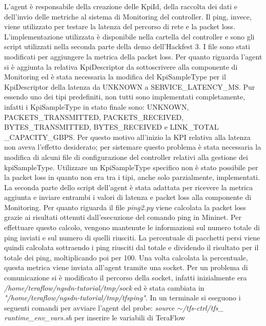 L'agent è responsabile della creazione delle KpiId, della raccolta dei dati e dell'invio delle metriche al sistema di Monitoring del controller.
Il ping, invece, viene utilizzato per testare la latenza del percorso di rete e la packet loss.
\newline L'implementazione utilizzata è disponibile nella cartella del controller \cite{probe} e sono gli script  
utilizzati nella seconda parte della demo dell'Hackfest 3.
\newline I file sono stati modificati per aggiungere la metrica della packet loss. 
Per quanto riguarda l'agent si è aggiunta la relativa KpiDescriptor da sottoscrivere alla componente di Monitoring ed
è stata necessaria la modifica del KpiSampleType per il KpiDescriptor della latenza da UNKNOWN a SERVICE\_LATENCY\_MS. 
Pur essendo uno dei tipi predefiniti, non tutti sono implementati completamente, infatti
i KpiSampleType in stato finale sono: UNKNOWN, PACKETS\_TRANSMITTED, PACKETS\_RECEIVED, BYTES\_TRANSMITTED, BYTES\_RECEIVED e LINK\_TOTAL \_CAPACITY\_GBPS.
Per questo motivo all'inizio la KPI relativa alla latenza non aveva l'effetto desiderato; per sistemare questo problema è stata necessaria la 
modifica di alcuni file di configurazione del controller relativi alla gestione dei kpiSampleType.
Utilizzare un KpiSampleType specifico non è stato possibile per la packet loss in quanto non era tra i tipi, anche solo parzialmente, implementati.  
La seconda parte dello script dell'agent è stata adattata per ricevere la metrica aggiunta e inviare entrambi i valori di latenza e packet loss alla componente di Monitoring.
Per quanto riguarda il file \textit{ping2.py} viene calcolata la packet loss grazie ai risultati ottenuti dall'esecuzione
del comando ping in Mininet.
Per effettuare questo calcolo, vengono mantenute le informazioni sul numero totale di ping inviati e sul numero di quelli riusciti.
La percentuale di pacchetti persi viene quindi calcolata sottraendo i ping riusciti dal totale e dividendo il risultato per il totale dei ping, moltiplicando poi per 100. 
Una volta calcolata la percentuale, questa metrica viene inviata all'agent tramite una socket.
Per un problema di comunicazione si è modificato il percorso della socket, infatti inizialmente era \textit{/home/teraflow/ngsdn-tutorial/tmp/sock} ed
è stata cambiata in \textit{"/home/teraflow/ngsdn-tutorial/tmp/tfsping"}.
\newline In un terminale si eseguono i seguenti comandi per avviare l'agent del probe: \textit{source $\sim$/tfs-ctrl/tfs\_ runtime\_env\_vars.sh} per inserire le variabili di TeraFlow
